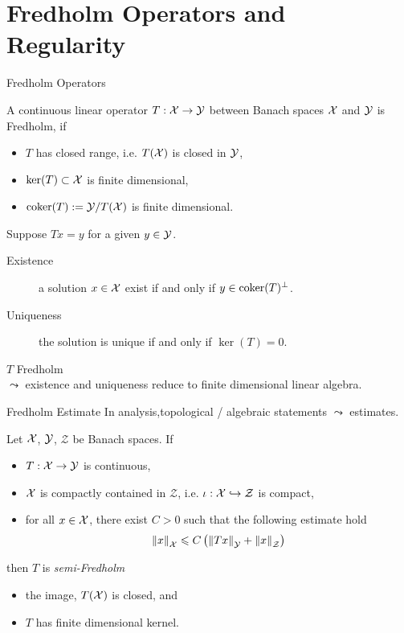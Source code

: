 \documentclass{beamer}
\begin{document}
\section{Fredholm Operators and Regularity} 


\begin{frame}{Fredholm Operators}
\begin{definition}
    A continuous linear operator $T : \X \to\Y$ between Banach spaces $\X$ and $\Y$ is Fredholm, if 
    \begin{itemize}
        \item $T$ has closed range, i.e. $T(\X)$ is closed in $\Y$, 
        \item $\ker(T) \subset \X $ is finite dimensional, 
        \item $\coker(T) := \Y / T(\X)$ is finite dimensional. 
    \end{itemize}
\end{definition}
\pause
Suppose $Tx = y$ for a given $y \in \Y$. 
\begin{description}
    \item[Existence] a solution $x \in \X$ exist if and only if  $y \in \coker(T)^\perp $. 
    \item[Uniqueness] the solution is unique if and only if $\ker(T) = 0$. 
\end{description}
\pause
$T$ Fredholm \\
$\leadsto$ existence and uniqueness reduce to finite dimensional linear algebra. 

\end{frame}

\begin{frame}{Fredholm Estimate}
In analysis,topological / algebraic statements $\leadsto$ estimates. 
\pause
\begin{theorem} \label{theorem: fredholm estimates}
    Let $\X$, $\Y$, $\mathcal{Z}$ be Banach spaces.  If 
    \begin{itemize}
        \item $T : \X \to \Y$ is continuous, 
        \item $\X$ is compactly contained in $\mathcal{Z}$, i.e.  $\iota : \X\hookrightarrow \mathcal{Z}$ is compact, 
        \item for all $x \in \X$, there exist $C > 0$ such that the  following estimate hold
        \begin{align}
        \norm[x]_\X \leq C \brac{\norm[Tx]_\Y + \norm[x]_\mathcal{Z}}
        \end{align}
    \end{itemize}
    then $T$ is \textit{semi-Fredholm}
    \begin{itemize}
        \item the image, $T(\X)$ is closed, and
        \item $T$ has finite dimensional kernel. 
    \end{itemize} 
\end{theorem}


\end{frame} 
\end{document}
